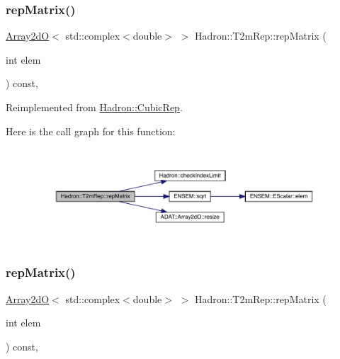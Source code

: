\subsubsection{\texorpdfstring{repMatrix()}{repMatrix()}\hspace{0.1cm}{\footnotesize\ttfamily [1/3]}}
{\footnotesize\ttfamily \mbox{\hyperlink{classADAT_1_1Array2dO}{Array2dO}}$<$ std\+::complex$<$double$>$ $>$ Hadron\+::\+T2m\+Rep\+::rep\+Matrix (\begin{DoxyParamCaption}\item[{int}]{elem }\end{DoxyParamCaption}) const\hspace{0.3cm}{\ttfamily [inline]}, {\ttfamily [virtual]}}



Reimplemented from \mbox{\hyperlink{structHadron_1_1CubicRep_ac5d7e9e6f4ab1158b5fce3e4ad9e8005}{Hadron\+::\+Cubic\+Rep}}.

Here is the call graph for this function\+:
\nopagebreak
\begin{figure}[H]
\begin{center}
\leavevmode
\includegraphics[width=350pt]{d7/dc8/structHadron_1_1T2mRep_a19df67dde8ae1b7f7436559ee5218f13_cgraph}
\end{center}
\end{figure}
\mbox{\label{structHadron_1_1T2mRep_a19df67dde8ae1b7f7436559ee5218f13}} 
\subsubsection{\texorpdfstring{repMatrix()}{repMatrix()}\hspace{0.1cm}{\footnotesize\ttfamily [2/3]}}
{\footnotesize\ttfamily \mbox{\hyperlink{classADAT_1_1Array2dO}{Array2dO}}$<$ std\+::complex$<$double$>$ $>$ Hadron\+::\+T2m\+Rep\+::rep\+Matrix (\begin{DoxyParamCaption}\item[{int}]{elem }\end{DoxyParamCaption}) const\hspace{0.3cm}{\ttfamily [inline]}, {\ttfamily [virtual]}}



